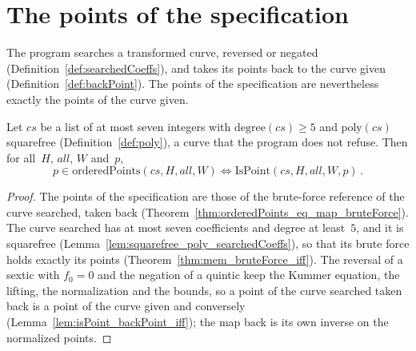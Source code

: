 
\section{The points of the specification}\label{sec:theoremsPoints}

The program searches a transformed curve, reversed or negated (Definition~\ref{def:searchedCoeffs}),
and takes its points back to the curve given (Definition~\ref{def:backPoint}). The points of the
specification are nevertheless exactly the points of the curve given.

\begin{theorem}\label{thm:mem_orderedPoints_iff}
  \leanok
  Let $\mathit{cs}$ be a list of at most seven integers with $\mathrm{degree}(\mathit{cs}) \ge 5$
  and $\mathrm{poly}(\mathit{cs})$ squarefree (Definition~\ref{def:poly}), a curve that the program
  does not refuse. Then for all~$H$, $\mathit{all}$, $W$ and~$p$,
  \[ p \in \mathrm{orderedPoints}(\mathit{cs}, H, \mathit{all}, W) \iff
     \mathrm{IsPoint}(\mathit{cs}, H, \mathit{all}, W, p)\,. \]
\end{theorem}

\begin{proof}
  \leanok
  The points of the specification are those of the brute-force reference of the curve searched,
  taken back (Theorem~\ref{thm:orderedPoints_eq_map_bruteForce}). The curve searched has at most
  seven coefficients and degree at least~$5$, and it is squarefree
  (Lemma~\ref{lem:squarefree_poly_searchedCoeffs}), so that its brute force holds exactly its points
  (Theorem~\ref{thm:mem_bruteForce_iff}). The reversal of a sextic with $f_0 = 0$ and the negation
  of a quintic keep the Kummer equation, the lifting, the normalization and the bounds, so a point
  of the curve searched taken back is a point of the curve given and conversely
  (Lemma~\ref{lem:isPoint_backPoint_iff}); the map back is its own inverse on the normalized
  points.
\end{proof}

